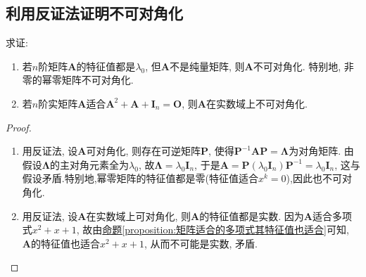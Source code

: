 \documentclass[../../main.tex]{subfiles}
\begin{document}
\subsection{利用反证法证明不可对角化}

\begin{example}\label{example-0.10}
求证:
\begin{enumerate}[(1)]
\item 若\(n\)阶矩阵\(\boldsymbol{A}\)的特征值都是\(\lambda_0\), 但\(\boldsymbol{A}\)不是纯量矩阵, 则\(\boldsymbol{A}\)不可对角化. 特别地, 非零的幂零矩阵不可对角化.

\item 若\(n\)阶实矩阵\(\boldsymbol{A}\)适合\(\boldsymbol{A}^2 + \boldsymbol{A} + \boldsymbol{I}_n = \boldsymbol{O}\), 则\(\boldsymbol{A}\)在实数域上不可对角化.
\end{enumerate}
\end{example}
\begin{proof}
\begin{enumerate}[(1)]
\item 用反证法, 设\(\boldsymbol{A}\)可对角化, 则存在可逆矩阵\(\boldsymbol{P}\), 使得\(\boldsymbol{P}^{-1}\boldsymbol{A}\boldsymbol{P} = \boldsymbol{\Lambda}\)为对角矩阵. 由假设\(\boldsymbol{\Lambda}\)的主对角元素全为\(\lambda_0\), 故\(\boldsymbol{\Lambda} = \lambda_0\boldsymbol{I}_n\), 于是\(\boldsymbol{A} = \boldsymbol{P}(\lambda_0\boldsymbol{I}_n)\boldsymbol{P}^{-1} = \lambda_0\boldsymbol{I}_n\), 这与假设矛盾.特别地,幂零矩阵的特征值都是零(特征值适合$x^k=0$),因此也不可对角化.

\item 用反证法, 设\(\boldsymbol{A}\)在实数域上可对角化, 则\(\boldsymbol{A}\)的特征值都是实数. 因为\(\boldsymbol{A}\)适合多项式\(x^2 + x + 1\), 故由\hyperref[proposition:矩阵适合的多项式其特征值也适合]{命题\ref{proposition:矩阵适合的多项式其特征值也适合}}可知, \(\boldsymbol{A}\)的特征值也适合\(x^2 + x + 1\), 从而不可能是实数, 矛盾.
\end{enumerate}
\end{proof}
\end{document}
